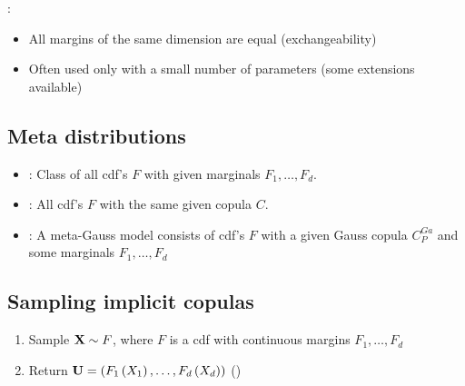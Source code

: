 :
\begin{itemize}[leftmargin=*]
    \item All margins of the same dimension are
equal (exchangeability)
    \item Often used only with a small number of
parameters (some extensions available)
\end{itemize}







\subsection*{Meta distributions}
\begin{itemize}[leftmargin=*]
    \item {}: Class of all cdf's $F$ with given marginals $F_{1}, \ldots, F_{d}$.

    \item {}: All cdf's $F$ with the same given copula $C$.
    
    \item {}: A meta-Gauss model consists of cdf's $F$ with a given Gauss copula $C_{P}^{G a}$ and some marginals $F_{1}, \ldots, F_{d}$

\end{itemize}













\subsection*{Sampling implicit copulas}
\begin{enumerate}[label = (\arabic*), leftmargin=*]
    \item Sample $\operatorname{\boldsymbol{\mathbf{X}}} \sim F$, where $F$ is a cdf with continuous margins $F_{1}, \ldots, F_{d}$
    \item Return $\operatorname{\boldsymbol{\mathbf{U}}}=\left(F_{1}\left(X_{1}\right), \ldots, F_{d}\left(X_{d}\right)\right)$ ()
\end{enumerate}

